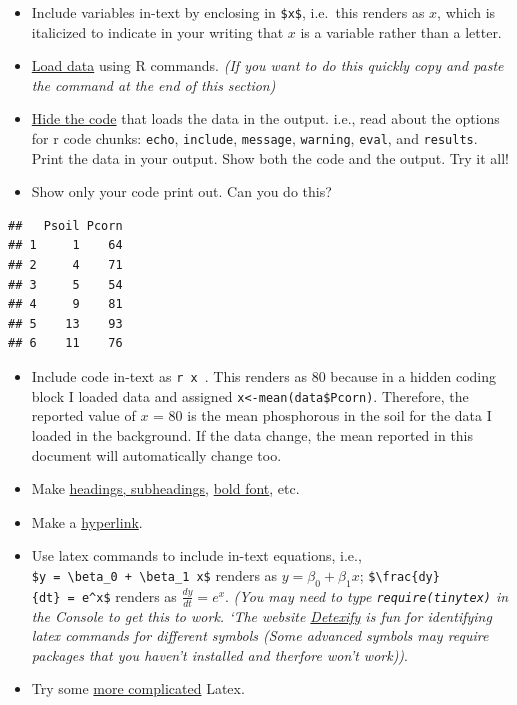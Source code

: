\documentclass[
]{book}
\begin{document}
\begin{itemize}
\item
  Include variables in-text by enclosing in \texttt{\$x\$}, i.e.~this renders as \(x\), which is italicized to indicate in your writing that \(x\) is a variable rather than a letter.
\item
  \href{https://ahurford.github.io/quant-guide-all-courses/data-entry.html\#loading-or-importing-data}{Load data} using R commands. \emph{(If you want to do this quickly copy and paste the command at the end of this section)}
\item
  \href{https://bookdown.org/yihui/rmarkdown/r-code.html}{Hide the code} that loads the data in the output. i.e., read about the options for r code chunks: \texttt{echo}, \texttt{include}, \texttt{message}, \texttt{warning}, \texttt{eval}, and \texttt{results}. Print the data in your output. Show both the code and the output. Try it all!
\item
  Show only your code print out. Can you do this?
\end{itemize}

\begin{verbatim}
##   Psoil Pcorn
## 1     1    64
## 2     4    71
## 3     5    54
## 4     9    81
## 5    13    93
## 6    11    76
\end{verbatim}

\begin{itemize}
\item
  Include code in-text as \texttt{\textasciigrave{}r\ x\ \textasciigrave{}}. This renders as 80 because in a hidden coding block I loaded data and assigned \texttt{x\textless{}-mean(data\$Pcorn)}. Therefore, the reported value of \(x\) = 80 is the mean phosphorous in the soil for the data I loaded in the background. If the data change, the mean reported in this document will automatically change too.
\item
  Make \href{https://bookdown.org/yihui/rmarkdown/markdown-syntax.html\#block-level-elements}{headings, subheadings}, \href{https://bookdown.org/yihui/rmarkdown/markdown-syntax.html\#inline-formatting}{bold font}, etc.
\item
  Make a \href{https://bookdown.org/yihui/rmarkdown/markdown-syntax.html\#inline-formatting}{hyperlink}.
\item
  Use latex commands to include in-text equations, i.e., \texttt{\$y\ =\ \textbackslash{}beta\_0\ +\ \textbackslash{}beta\_1\ x\$} renders as \(y = \beta_0 + \beta_1 x\); \texttt{\$\textbackslash{}frac\{dy\}\{dt\}\ =\ e\^{}x\$} renders as \(\frac{dy}{dt} = e^x\). \emph{(You may need to type \texttt{require(tinytex)} in the Console to get this to work. `The website \href{https://detexify.kirelabs.org/classify.html}{Detexify} is fun for identifying latex commands for different symbols (Some advanced symbols may require packages that you haven't installed and therfore won't work))}.
\item
  Try some \href{https://bookdown.org/yihui/rmarkdown/markdown-syntax.html\#math-expressions}{more complicated} Latex.
\end{itemize}
\end{document}
